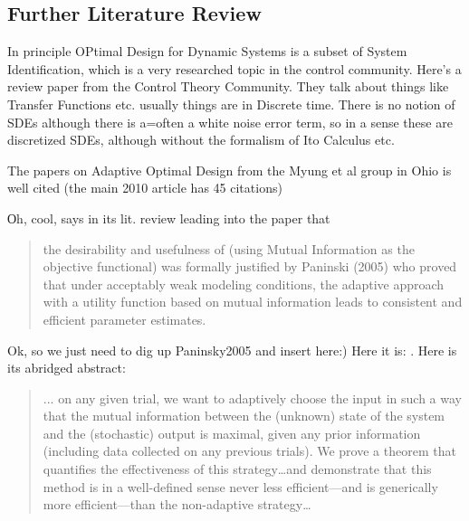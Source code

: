 \subsection{Further Literature Review}	
In principle OPtimal Design for Dynamic Systems is a subset of System
Identification, which is a very researched topic in the control community.
Here's a review paper \cite{Gevers2011} from the Control Theory Community. 
They talk about things like Transfer Functions etc. usually things are in
Discrete time. There is no notion of SDEs although there is a=often a white
noise error term, so in a sense these are discretized SDEs, although without 
the formalism of Ito Calculus etc. 

The papers on Adaptive Optimal Design from the Myung et al group in Ohio is well
cited (the main 2010 \cite{Cavagnaro2010} article has 45 citations) 

Оh, cool,  \cite{Cavagnaro2010} says in its lit. review leading into the paper
that 
\begin{quote}
the desirability and usefulness of (using Mutual Information as the objective
functional) was formally justified by Paninski (2005) who proved that under
acceptably weak modeling conditions, the adaptive approach with a utility function
based on mutual information leads to consistent and efficient parameter
estimates. 
\end{quote}

Ok, so we just need to dig up Paninsky2005 and insert here:) Here it is:
\cite{Paninski2005}. Here is its abridged abstract:
\begin{quote}
... on any given trial,
we want to adaptively choose the input in such a way that the mutual information
between the (unknown) state of the system and the (stochastic)
output is maximal, given any prior information (including data collected
on any previous trials). We prove a theorem that quantifies the effectiveness
of this strategy\ldots and demonstrate that
this method is in a well-defined sense never less efficient—and is generically
more efficient—than the non-adaptive strategy\ldots  
\end{quote}

